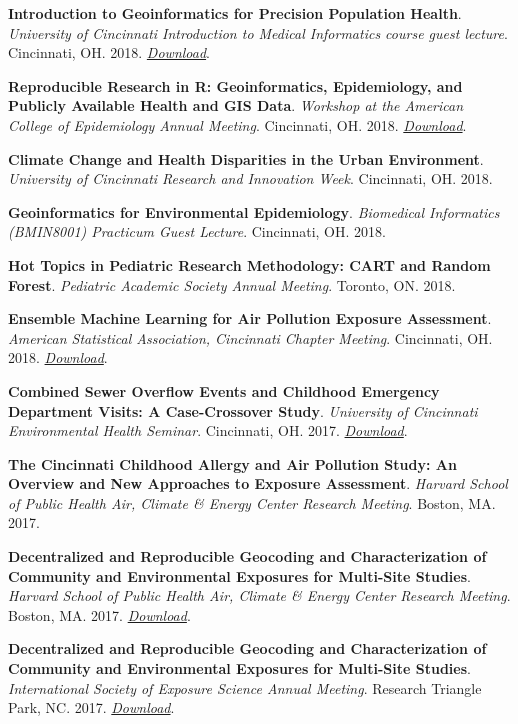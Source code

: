 \textbf{Introduction to Geoinformatics for Precision Population Health}.
\emph{University of Cincinnati Introduction to Medical Informatics
course guest lecture}. Cincinnati, OH. 2018.
\href{https://colebrokamp-website.s3.amazonaws.com/talks/GRAPPH_talk_informatics_2018.pdf}{\emph{Download}}.

\textbf{Reproducible Research in R: Geoinformatics, Epidemiology, and
Publicly Available Health and GIS Data}. \emph{Workshop at the American
College of Epidemiology Annual Meeting}. Cincinnati, OH. 2018.
\href{https://github.com/cole-brokamp/geoinformatics_and_population_health_in_R}{\emph{Download}}.

\textbf{Climate Change and Health Disparities in the Urban Environment}.
\emph{University of Cincinnati Research and Innovation Week}.
Cincinnati, OH. 2018.

\textbf{Geoinformatics for Environmental Epidemiology}. \emph{Biomedical
Informatics (BMIN8001) Practicum Guest Lecture}. Cincinnati, OH. 2018.

\textbf{Hot Topics in Pediatric Research Methodology: CART and Random
Forest}. \emph{Pediatric Academic Society Annual Meeting}. Toronto, ON.
2018.

\textbf{Ensemble Machine Learning for Air Pollution Exposure
Assessment}. \emph{American Statistical Association, Cincinnati Chapter
Meeting}. Cincinnati, OH. 2018.
\href{https://colebrokamp-website.s3.amazonaws.com/talks/LURF_talk_20_FEB_2018.pdf}{\emph{Download}}.

\textbf{Combined Sewer Overflow Events and Childhood Emergency
Department Visits: A Case-Crossover Study}. \emph{University of
Cincinnati Environmental Health Seminar}. Cincinnati, OH. 2017.
\href{https://colebrokamp-website.s3.amazonaws.com/talks/cso_talk_30_November_2017.pdf}{\emph{Download}}.

\textbf{The Cincinnati Childhood Allergy and Air Pollution Study: An
Overview and New Approaches to Exposure Assessment}. \emph{Harvard
School of Public Health Air, Climate \& Energy Center Research Meeting}.
Boston, MA. 2017.

\textbf{Decentralized and Reproducible Geocoding and Characterization of
Community and Environmental Exposures for Multi-Site Studies}.
\emph{Harvard School of Public Health Air, Climate \& Energy Center
Research Meeting}. Boston, MA. 2017.
\href{https://colebrokamp-website.s3.amazonaws.com/talks/DeGAUSS_talk_13_NOV_2017.pdf}{\emph{Download}}.

\textbf{Decentralized and Reproducible Geocoding and Characterization of
Community and Environmental Exposures for Multi-Site Studies}.
\emph{International Society of Exposure Science Annual Meeting}.
Research Triangle Park, NC. 2017.
\href{https://colebrokamp-website.s3.amazonaws.com/talks/DeGAUSS_talk_ISES2017.pdf}{\emph{Download}}.

